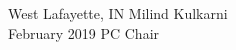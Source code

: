 \documentclass[12pt,letterpaper]{article}
\begin{document}
%
%
%
%
%
%
%
\bigskip
\noindent
West Lafayette, IN       \hfill Milind Kulkarni\\
February 2019 \hfill PC Chair
\end{document}
